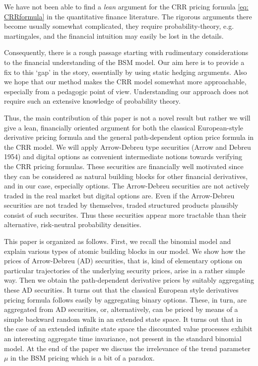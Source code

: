 \documentclass{amsart}
\theoremstyle{definition}
\theoremstyle{remark}
\numberwithin{equation}{section}
\newcommand{\1}{\boldsymbol{1}}
\begin{document}
We have not been able to find a \emph{lean} argument for the CRR pricing formula \eqref{eq: CRRformula} in the quantitative finance literature. The rigorous arguments there become usually somewhat complicated, they require probability-theory, e.g. martingales, and the financial intuition may easily be lost in the details.

Consequently, there is a rough passage starting with rudimentary considerations to the financial understanding of the BSM model. Our aim here is to provide a fix to this `gap' in the story, essentially by using static hedging arguments. Also we hope that our method makes the CRR model somewhat more approachable, especially from a pedagogic point of view. Understanding our approach does not require such an extensive knowledge of probability theory.


Thus, the main contribution of this paper is not a novel result but rather we will give a lean, financially 
oriented argument for both the classical European-style derivative pricing formula and the general path-dependent option price formula in the CRR model. We will apply Arrow-Debreu type securities (Arrow and Debreu 1954) and digital options as convenient intermediate notions towards verifying the CRR pricing formulas. These securities are financially well motivated since they can be considered as natural building blocks for other financial derivatives, and in our case, especially options. The Arrow-Debreu securities are not actively traded in the real market
but digital options are. Even if the Arrow-Debreu securities are not traded by themselves, traded structured products plausibly consist of such securites. Thus these securities appear more tractable than their alternative, risk-neutral probability densities.


This paper is organized as follows. First, we recall the binomial model and explain various types of atomic building blocks in our model. We show how the prices of Arrow-Debreu (AD) securities, that is, kind of elementary options on 
particular trajectories of the underlying security prices, arise in a rather simple way. Then we obtain the path-dependent derivative prices by suitably aggregating these AD securities. It turns out that the classical European style derivatives pricing formula 
follows easily by aggregating binary options. These, in turn, are aggregated from AD securities, or, alternatively, can be priced by means of a simple backward random walk in an extended state space. It turns out that in the case of an extended infinite state space the discounted value processes exhibit an interesting aggregate time invariance, not present in the standard binomial model. At the end of the paper we discuss the irrelevance of the trend parameter $\mu$
in the BSM pricing which is a bit of a paradox. 
\end{document}
